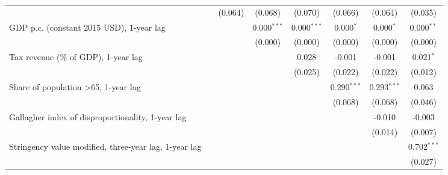 \begin{table}[htbp]
\begin{tabular}{lccccccc}
                                                                                                 &             & (0.064)     & (0.068)       & (0.070)       & (0.066)       & (0.064)       & (0.035)\\   
      GDP p.c. (constant 2015 USD), 1-year lag                                                   &             &             & 0.000$^{***}$ & 0.000$^{***}$ & 0.000$^{*}$   & 0.000$^{*}$   & 0.000$^{**}$\\   
                                                                                                 &             &             & (0.000)       & (0.000)       & (0.000)       & (0.000)       & (0.000)\\   
      Tax revenue (\% of GDP), 1-year lag                                                        &             &             &               & 0.028         & -0.001        & -0.001        & 0.021$^{*}$\\   
                                                                                                 &             &             &               & (0.025)       & (0.022)       & (0.022)       & (0.012)\\   
      Share of population >65, 1-year lag                                                        &             &             &               &               & 0.290$^{***}$ & 0.293$^{***}$ & 0.063\\   
                                                                                                 &             &             &               &               & (0.068)       & (0.068)       & (0.046)\\   
      Gallagher index of disproportionality, 1-year lag                                          &             &             &               &               &               & -0.010        & -0.003\\   
                                                                                                 &             &             &               &               &               & (0.014)       & (0.007)\\   
      Stringency value modified, three-year lag, 1-year lag                                      &             &             &               &               &               &               & 0.702$^{***}$\\   
                                                                                                 &             &             &               &               &               &               & (0.027)\\   

\end{tabular}
\end{table}
